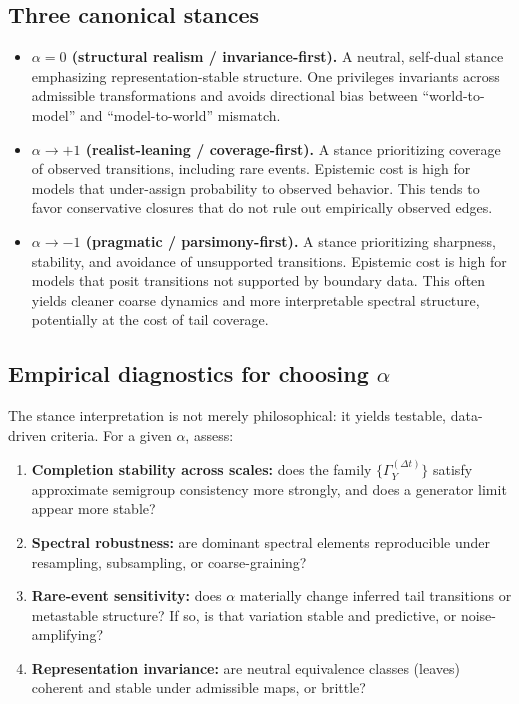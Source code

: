 \documentclass[11pt]{article}
\begin{document}
\subsection{Three canonical stances}
\begin{itemize}[leftmargin=1.6em]
\item \textbf{$\alpha=0$ (structural realism / invariance-first).}
A neutral, self-dual stance emphasizing representation-stable structure. One privileges invariants
across admissible transformations and avoids directional bias between ``world-to-model'' and
``model-to-world'' mismatch.

\item \textbf{$\alpha\to +1$ (realist-leaning / coverage-first).}
A stance prioritizing coverage of observed transitions, including rare events. Epistemic cost is high
for models that under-assign probability to observed behavior. This tends to favor conservative
closures that do not rule out empirically observed edges.

\item \textbf{$\alpha\to -1$ (pragmatic / parsimony-first).}
A stance prioritizing sharpness, stability, and avoidance of unsupported transitions. Epistemic cost
is high for models that posit transitions not supported by boundary data. This often yields cleaner
coarse dynamics and more interpretable spectral structure, potentially at the cost of tail coverage.
\end{itemize}

\subsection{Empirical diagnostics for choosing $\alpha$}
The stance interpretation is not merely philosophical: it yields testable, data-driven criteria.
For a given $\alpha$, assess:
\begin{enumerate}[leftmargin=1.8em]
\item \textbf{Completion stability across scales:} does the family $\{\Gamma_Y^{(\Delta t)}\}$ satisfy
approximate semigroup consistency more strongly, and does a generator limit appear more stable?
\item \textbf{Spectral robustness:} are dominant spectral elements reproducible under resampling,
subsampling, or coarse-graining?
\item \textbf{Rare-event sensitivity:} does $\alpha$ materially change inferred tail transitions or
metastable structure? If so, is that variation stable and predictive, or noise-amplifying?
\item \textbf{Representation invariance:} are neutral equivalence classes (leaves) coherent and
stable under admissible maps, or brittle?
\end{enumerate}
\end{document}
